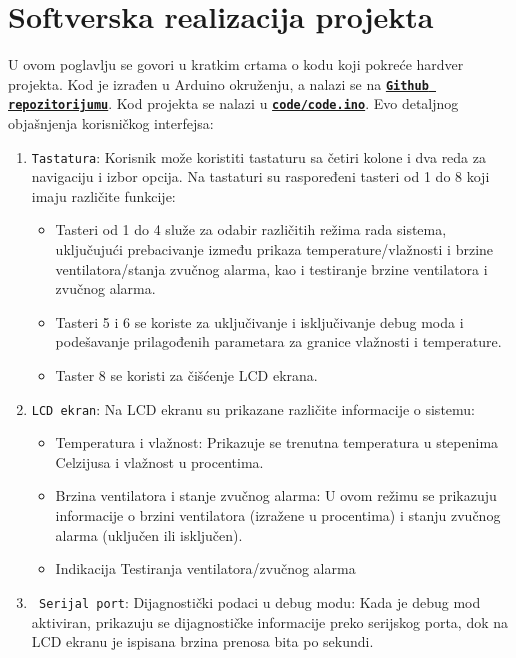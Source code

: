 \documentclass[a4paper, 12pt]{article}
\begin{document}
\vspace{10pt}

\pagebreak
\endgroup

\begingroup
\sloppy

\section{Softverska realizacija projekta}

\vspace{10pt}

U ovom poglavlju se govori u kratkim crtama o kodu koji pokreće hardver projekta. Kod je izrađen u Arduino okruženju, a nalazi se na \textbf{\texttt{\href{https://github.com/vgalovic/temperature-and-humidity-regulator.git}{Github repozitorijumu}}}. Kod projekta se nalazi u  \textbf{\texttt{\href{https://github.com/vgalovic/temperature-and-humidity-regulator/blob/main/code/code.ino}{code/code.ino}}}. Evo detaljnog objašnjenja korisničkog interfejsa:
 
\begin{enumerate}

	\item \texttt{Tastatura}: Korisnik može koristiti tastaturu sa četiri kolone i dva reda za navigaciju i izbor opcija. Na tastaturi su raspoređeni tasteri od 1 do 8 koji imaju različite funkcije:
	\begin{itemize}
		\sloppypar
		\item Tasteri od 1 do 4 služe za odabir različitih režima rada sistema, uključujući prebacivanje između prikaza temperature/vlažnosti i brzine ventilatora/stanja zvučnog alarma, kao i testiranje brzine ventilatora i zvučnog alarma.
        \item Tasteri 5 i 6 se koriste za uključivanje i isključivanje debug moda i podešavanje prilagođenih parametara za granice vlažnosti i temperature.
        \item Taster 8 se koristi za čišćenje LCD ekrana.
	\end{itemize}
	
	
  	\item \texttt{LCD ekran}: Na LCD ekranu su prikazane različite informacije o sistemu:
  	\begin{itemize}
  		\item Temperatura i vlažnost: Prikazuje se trenutna temperatura u stepenima Celzijusa i vlažnost u procentima.
       	\item Brzina ventilatora i stanje zvučnog alarma: U ovom režimu se prikazuju informacije o brzini ventilatora (izražene u procentima) i stanju zvučnog alarma (uključen ili isključen).
		\item Indikacija Testiranja ventilatora/zvučnog alarma
  	\end{itemize}
  	
  	\item \texttt{ Serijal port}: Dijagnostički podaci u debug modu: Kada je debug mod aktiviran, prikazuju se dijagnostičke informacije preko serijskog porta, dok na LCD ekranu je ispisana brzina prenosa bita po sekundi.
\end{enumerate}
\end{document}
